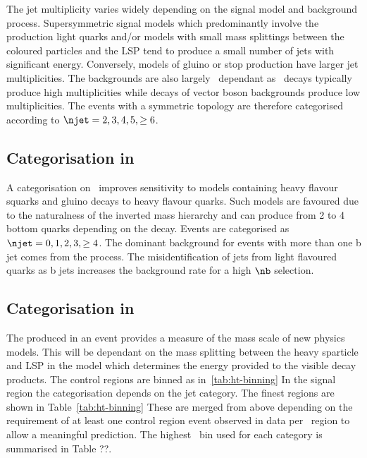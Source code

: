 The jet multiplicity varies widely depending on the signal model and background process.
Supersymmetric signal models which predominantly involve the production light quarks and/or models 
with small mass splittings between the coloured particles and the LSP tend to produce 
a small number of jets with significant energy. Conversely, models of gluino or stop production
have larger jet multiplicities. The backgrounds are also largely \njet~dependant as 
\ttbar~decays typically produce high multiplicities while decays of vector boson backgrounds
produce low multiplicities. The events with a symmetric topology are therefore categorised according
to $\njet = 2,3,4,5,\ge6$.

\subsection{Categorisation in \nb}

A categorisation on \nb~improves sensitivity to models containing heavy flavour squarks and gluino
decays to heavy flavour quarks. Such models are favoured due to the naturalness of the
inverted mass hierarchy and can produce from 2 to 4 bottom quarks depending on the decay.
Events are categorised as $\njet = 0,1,2,3,\ge4$. The dominant background for events 
with more than one b jet comes from the \ttbar process. The misidentification of 
jets from light flavoured quarks as b jets increases the background rate for a high $\nb$ selection.

\subsection{Categorisation in \scalht}

The \scalht produced in an event provides a measure of the mass scale of 
new physics models. This will be dependant on the mass splitting between
the heavy sparticle and LSP in the model which determines the energy
provided to the visible decay products. The control regions are binned
as in~\ref{tab:ht-binning} In the signal region the \scalht categorisation depends 
on the jet category. The finest \scalht regions are shown in Table~\ref{tab:ht-binning}
These are merged from above depending on the requirement of at least one control region
event observed in data per \scalht~region to allow a meaningful prediction.
The highest \scalht~bin used for each category is summarised in Table ??.

